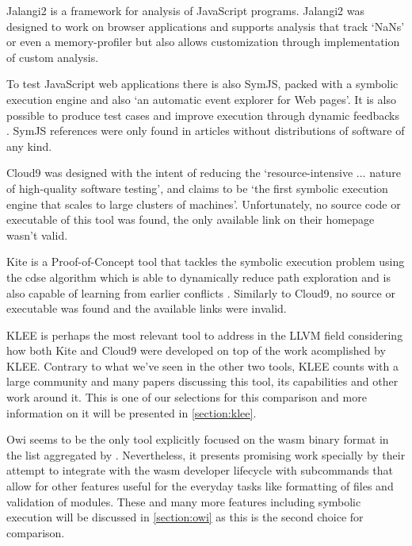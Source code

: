 Jalangi2 is a framework for analysis of JavaScript programs. Jalangi2 was designed to work on browser applications and supports analysis that track `NaNs' or even a memory-profiler but also allows customization through implementation of custom analysis.

To test JavaScript web applications there is also SymJS, packed with a symbolic execution engine and also `an automatic event explorer for Web pages'. It is also possible to produce test cases and improve execution through dynamic feedbacks \citep{Li2014}. SymJS references were only found in articles without distributions of software of any kind.

Cloud9 was designed with the intent of reducing the `resource-intensive ... nature of high-quality software testing', and claims to be `the first symbolic execution engine that scales to large clusters of machines'. Unfortunately, no source code or executable of this tool was found, the only available link on their homepage wasn't valid.

Kite is a Proof-of-Concept tool that tackles the symbolic execution problem using the \acrfull{cdse} algorithm which is able to dynamically reduce path exploration and is also capable of learning from earlier conflicts \citep{cdse_kite}. Similarly to Cloud9, no source or executable was found and the available links were invalid.


KLEE is perhaps the most relevant tool to address in the LLVM field considering how both Kite and Cloud9 were developed on top of the work acomplished by KLEE. Contrary to what we've seen in the other two tools, KLEE counts with a large community and many papers discussing this tool, its capabilities and other work around it. This is one of our selections for this comparison and more information on it will be presented in \cref{section:klee}.

Owi seems to be the only tool explicitly focused on the \acrlong{wasm} binary format in the list aggregated by \citeauthor{Luckow2017}. Nevertheless, it presents promising work specially by their attempt to integrate with the \acrshort{wasm} developer lifecycle with subcommands that allow for other features useful for the everyday tasks like formatting of files and validation of modules. These and many more features including symbolic execution will be discussed in \cref{section:owi} as this is the second choice for comparison.
